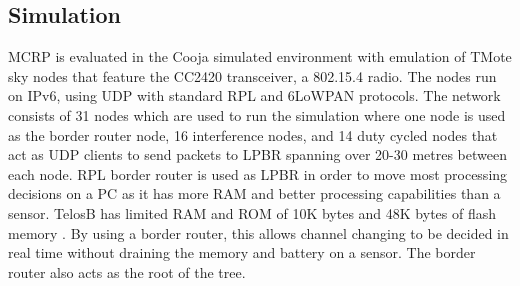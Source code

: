 

\subsection{Simulation}
MCRP is evaluated in the Cooja simulated environment with emulation of TMote sky nodes that feature the CC2420 transceiver, a 802.15.4 radio. The nodes run on IPv6, using UDP with standard RPL and 6LoWPAN protocols. The network consists of 31 nodes which are used to run the simulation where one node is used as the border router node, 16 interference nodes, and 14 duty cycled nodes that act as UDP clients to send packets to LPBR spanning over 20-30 metres between each node. RPL border router is used as LPBR in order to move most processing decisions on a PC as it has more RAM and better processing capabilities than a sensor. TelosB has limited RAM and ROM of 10K bytes and 48K bytes of flash memory \cite{telosb-datasheet}. By using a border router, this allows channel changing to be decided in real time without draining the memory and battery on a sensor. The border router also acts as the root of the tree.
